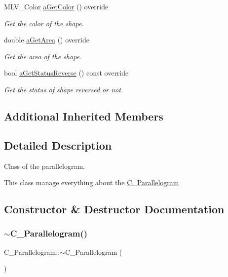 \begin{DoxyCompactItemize}
M\+L\+V\+\_\+\+Color \hyperlink{classC__Parallelogram_afd5055e948fcd992be3cdd227c8b4bfb}{a\+Get\+Color} () override
\begin{DoxyCompactList}\small\item\em Get the color of the shape. \end{DoxyCompactList}\item 
double \hyperlink{classC__Parallelogram_a72b4509a33ee27331e5b9bdc8a3278e8}{a\+Get\+Area} () override
\begin{DoxyCompactList}\small\item\em Get the area of the shape. \end{DoxyCompactList}\item 
bool \hyperlink{classC__Parallelogram_a14b00a011ff4fe3170c5ab11af628252}{a\+Get\+Status\+Reverse} () const override
\begin{DoxyCompactList}\small\item\em Get the status of shape reversed or not. \end{DoxyCompactList}\end{DoxyCompactItemize}
\subsection*{Additional Inherited Members}


\subsection{Detailed Description}
Class of the parallelogram. 

This class manage everything about the \hyperlink{classC__Parallelogram}{C\+\_\+\+Parallelogram} 

\subsection{Constructor \& Destructor Documentation}
\mbox{\label{classC__Parallelogram_a2d7af48f3a26e8e07031e7c147a084a3}} 
\subsubsection{\texorpdfstring{$\sim$\+C\+\_\+\+Parallelogram()}{~C\_Parallelogram()}}
{\footnotesize\ttfamily C\+\_\+\+Parallelogram\+::$\sim$\+C\+\_\+\+Parallelogram (\begin{DoxyParamCaption}{ }\end{DoxyParamCaption})\hspace{0.3cm}{\ttfamily [override]}}



